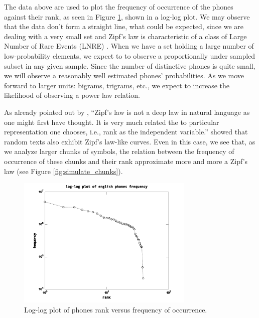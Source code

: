 The data above are used to plot the frequency of occurrence of the phones against 
their rank, as seen in Figure \ref{fig:phonesfrequency_en}, shown in a log-log plot. 
We may observe that the data don't form a straight line, 
what could be expected, since we are dealing with a very small set and Zipf's law is
characteristic of a class of Large Number of Rare Events (LNRE) \citep{baayen2001}. 
When we have a set holding a large number of low-probability elements, we expect to
to observe a proportionally under sampled subset in any given sample.
Since the number of distinctive phones is quite small, we will observe a reasonably
well estimated phones' probabilities. As we move forward to larger units: bigrams, trigrams,
etc., we expect to increase the likelihood of observing a power law relation.

As already pointed out by \cite{li1992}, ``Zipf's law is not a deep law in natural language 
as one might first have thought. It is very much related the to particular representation one 
chooses, i.e., rank as the independent variable.'' \cite{li1992} showed that random texts also 
exhibit Zipf's law-like curves. Even in this case, we see that, as we analyze larger chunks of 
symbols, the relation between the frequency of occurrence of these chunks and their rank 
approximate more and more a Zipf's law (see Figure \ref{fig:simulate_chunks}).

\begin{figure}[h!]
\centering
\includegraphics[width=0.75\textwidth]{images/phonesfrequency_en.pdf}
\caption{Log-log plot of phones rank versus frequency of occurrence.}
\label{fig:phonesfrequency_en}
\end{figure} 


